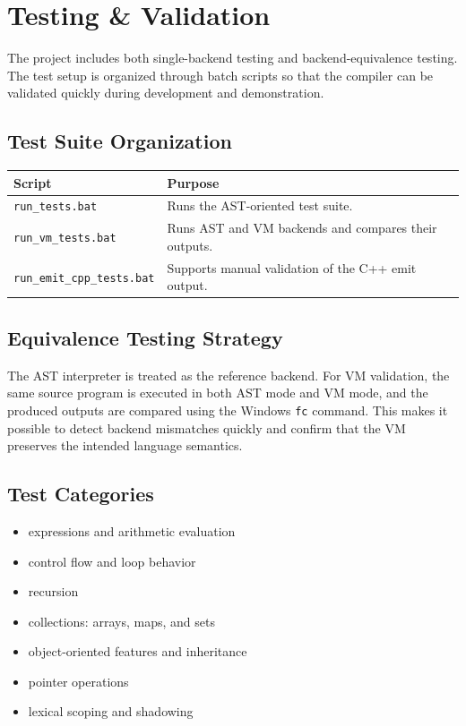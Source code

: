 \documentclass[12pt,a4paper]{article}
\begin{document}
\section{Testing \& Validation}

The project includes both single-backend testing and backend-equivalence testing. The test setup is organized through batch scripts so that the compiler can be validated quickly during development and demonstration.

\subsection*{Test Suite Organization}

\begin{table}[H]
\centering
\begin{tabularx}{\textwidth}{l X}
\toprule
\textnormal{Script} & \textnormal{Purpose} \\
\midrule
\texttt{run\_tests.bat} & Runs the AST-oriented test suite. \\
\texttt{run\_vm\_tests.bat} & Runs AST and VM backends and compares their outputs. \\
\texttt{run\_emit\_cpp\_tests.bat} & Supports manual validation of the C++ emit output. \\
\bottomrule
\end{tabularx}
\end{table}

\subsection*{Equivalence Testing Strategy}

The AST interpreter is treated as the reference backend. For VM validation, the same source program is executed in both AST mode and VM mode, and the produced outputs are compared using the Windows \texttt{fc} command. This makes it possible to detect backend mismatches quickly and confirm that the VM preserves the intended language semantics.

\subsection*{Test Categories}

\begin{itemize}
\item expressions and arithmetic evaluation
\item control flow and loop behavior
\item recursion
\item collections: arrays, maps, and sets
\item object-oriented features and inheritance
\item pointer operations
\item lexical scoping and shadowing
\end{itemize}
\end{document}

